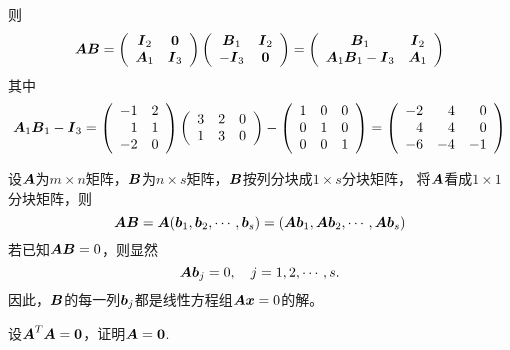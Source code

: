 则
$$
\MA\MB = \left(
  \begin{array}{cc}
    \MI_2 & \M0\\
    \MA_1 & \MI_3
  \end{array}
\right)\left(
  \begin{array}{cc}
    \MB_1 & \MI_2\\
    -\MI_3 & \M0
  \end{array}
\right) = \left(
  \begin{array}{cc}
    \MB_1 & \MI_2\\
    \MA_1\MB_1-\MI_3 & \MA_1
  \end{array}
\right)
$$
其中
$$
\boldsymbol{A}_1\boldsymbol{B}_1-\boldsymbol{I}_3 = \left(
  \begin{array}{rr}
    -1&2\\
    1&1\\
    -2&0
  \end{array}
\right)\left(
  \begin{array}{rrr}
    3&2&0\\
    1&3&0
  \end{array}
\right)-\left(
  \begin{array}{ccc}
    1&0&0\\
    0&1&0\\
    0&0&1
  \end{array}
\right)=\left(
  \begin{array}{rrr}
    -2&4&0\\
    4&4&0\\
    -6&-4&-1
  \end{array}
\right)
$$




\begin{li}
  设$\boldsymbol{A}$为$m\times n$矩阵，$\boldsymbol{B}$为$n\times s$矩阵，$\boldsymbol{B}$按列分块成$1\times s$分块矩阵，
  将$\boldsymbol{A}$看成$1\times 1$分块矩阵，则
  $$
  \boldsymbol{A}\boldsymbol{B}=\boldsymbol{A}({\boldsymbol{b}}_1,{\boldsymbol{b}}_2,\cdots,{\boldsymbol{b}}_s)=(\boldsymbol{A}{\boldsymbol{b}}_1,\boldsymbol{A}{\boldsymbol{b}}_2,\cdots,\boldsymbol{A}{\boldsymbol{b}}_s)      
  $$
  若已知$\boldsymbol{A}\boldsymbol{B}=0$，则显然
  $$
  \boldsymbol{A}{\boldsymbol{b}}_j=0, \quad j=1,2,\cdots,s.
  $$
  因此，$\boldsymbol{B}$的每一列${\boldsymbol{b}}_j$都是线性方程组$\boldsymbol{A}{\boldsymbol{x}}=0$的解。
\end{li}    



\begin{li}
  设$\MA^T\MA=\M0$，证明$\MA=\M0$.
\end{li}

